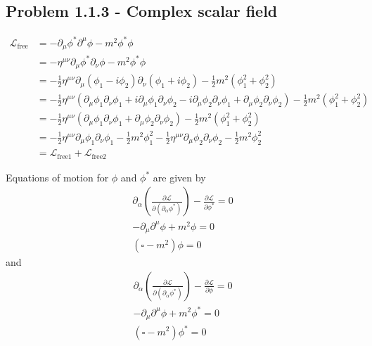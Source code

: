 \documentclass[10pt,a4paper]{book}
\theoremstyle{definition}
\begin{document}
\subsection{Problem 1.1.3 - Complex scalar field }
\begin{align}
    \mathcal{L}_\text{free}&=-\partial_\mu\phi^*\partial^\mu\phi-m^2\phi^*\phi\\
    &=-\eta^{\mu\nu}\partial_\mu\phi^*\partial_\nu\phi-m^2\phi^*\phi\\
    &=-\frac{1}{2}\eta^{\mu\nu}\partial_\mu(\phi_1-i\phi_2)\partial_\nu(\phi_1+i\phi_2)-\frac{1}{2}m^2(\phi_1^2+\phi_2^2)\\
    &=-\frac{1}{2}\eta^{\mu\nu}\left(
    \partial_\mu\phi_1\partial_\nu\phi_1
    +i\partial_\mu\phi_1\partial_\nu\phi_2
    -i\partial_\mu\phi_2\partial_\nu\phi_1
    +\partial_\mu\phi_2\partial_\nu\phi_2
    \right)-\frac{1}{2}m^2(\phi_1^2+\phi_2^2)\\
    &=-\frac{1}{2}\eta^{\mu\nu}\left(\partial_\mu\phi_1\partial_\nu\phi_1+\partial_\mu\phi_2\partial_\nu\phi_2\right)-\frac{1}{2}m^2(\phi_1^2+\phi_2^2)\\
    &=-\frac{1}{2}\eta^{\mu\nu}\partial_\mu\phi_1\partial_\nu\phi_1-\frac{1}{2}m^2\phi_1^2
    -\frac{1}{2}\eta^{\mu\nu}\partial_\mu\phi_2\partial_\nu\phi_2-\frac{1}{2}m^2\phi_2^2\\
    &=\mathcal{L}_\text{free1}+\mathcal{L}_\text{free2}
\end{align}

Equations of motion for $\phi$ and $\phi^*$ are given by
\begin{align}
    \partial_\alpha\left(\frac{\partial\mathcal{L}}{\partial(\partial_\alpha\phi^*)}\right)-\frac{\partial\mathcal{L}}{\partial\phi^*}=0\\
    -\partial_\mu\partial^\mu\phi+m^2\phi=0\\
    (\square-m^2)\phi=0
\end{align}
and
\begin{align}
    \partial_\alpha\left(\frac{\partial\mathcal{L}}{\partial(\partial_\alpha\phi^*)}\right)-\frac{\partial\mathcal{L}}{\partial\phi}=0\\
    -\partial_\mu\partial^\mu\phi+m^2\phi^*=0\\
    (\square-m^2)\phi^*=0
\end{align}
\end{document}
